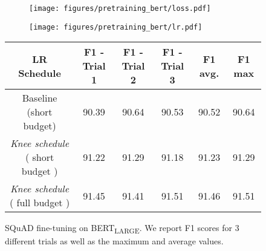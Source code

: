 \documentclass{article} \usepackage{iclr2021_conference,times}
\newcommand{\lrschedule}{\textit{Knee schedule}}
\begin{document}
\begin{figure}[ht]
\begin{minipage}{\textwidth}
  \begin{subfigure}[t]{\textwidth}
        \centering
        \texttt{[image: figures/pretraining\_bert/loss.pdf]}
        \label{fig:bert_tr_loss}
    \end{subfigure}
    \begin{subfigure}[t]{\textwidth}
        \centering
        \texttt{[image: figures/pretraining\_bert/lr.pdf]}
        \label{fig:bert_lr}
    \end{subfigure}
\caption{BERT\textsubscript{LARGE} pretraining for batch size of 16k with LAMB optimizer for the short budget runs. Shown are the training loss and learning rate as a function of steps, for the baseline scheme short budget (orange) vs the \lrschedule{} scheme short budget (blue). The plot is split into 2 parts to give a clear picture of the two phases of training~\cite{devlin2018bert}. Note that even though the training loss curves look similar for the two runs, we see a significant gap in F1 score obtained when we fine-tune the model checkpoints on SQuAD-v1.1 \cite{rajpurkar2016squad}. See Table~\ref{tab:bert-large_finetuning} for details.
}
\label{fig:bert_plots}
\end{minipage}
\begin{minipage}{\textwidth}
\small
\centering
\vspace{25pt}
\begin{tabular}{cccccc}
  \toprule
  LR Schedule & F1 - Trial 1   & F1 - Trial 2 & F1 - Trial 3 & F1 avg. & F1 max \\
  \midrule
    Baseline (short budget)  & 90.39 & 90.64 & 90.53 & 90.52 & 90.64\\
  \lrschedule{}{} ( short budget ) & 91.22  & 91.29 & 91.18 & 91.23 & 91.29\\
  \lrschedule{}{} ( full budget ) & 91.45  & 91.41 & 91.51 & 91.46 & 91.51\\
  
  \bottomrule
\end{tabular}
\captionsetup{type=table}
\caption{SQuAD fine-tuning on BERT\textsubscript{LARGE}. We report F1 scores for 3 different trials as well as the maximum and average values.}
\label{tab:bert-large_finetuning}
\end{minipage}
\end{figure}
\end{document}
